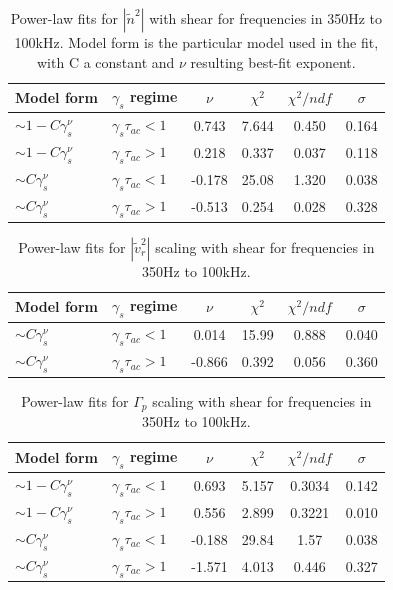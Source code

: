\documentclass[aip,pop,amsmath,amssymb,peprint,superscriptaddress]{revtex4-1} %
\begin{document}
\begin{table}
\caption{\label{tab:table1}Power-law fits for $|\tilde{n}^{2}|$  with shear for frequencies in 350Hz to 100kHz. Model form is the particular model used in the fit, with C a constant and $\nu$ resulting best-fit exponent.}
\begin{ruledtabular}
\begin{tabular}{llcccc}
Model form&$\gamma_{s}$ regime&$\nu$&$\chi^2$&$\chi^2/ndf$&$\sigma$\\
\hline
$\sim 1-C\gamma_{s}^\nu$&$\gamma_{s}\tau_{ac}<1$&0.743&7.644&0.450&0.164\\
$\sim 1-C\gamma_{s}^\nu$&$\gamma_{s}\tau_{ac}>1$&0.218&0.337&0.037&0.118\\
$\sim C\gamma_{s}^\nu$&$\gamma_{s}\tau_{ac}<1$&-0.178&25.08&1.320&0.038\\
$\sim C\gamma_{s}^\nu$&$\gamma_{s}\tau_{ac}>1$&-0.513&0.254&0.028&0.328\\
\end{tabular}
\end{ruledtabular}
\end{table}

\begin{table}
\caption{\label{tab:table2}Power-law fits for $|\tilde{v}_{r}^{2}|$ scaling with shear for frequencies in 350Hz to 100kHz.}
\begin{ruledtabular}
\begin{tabular}{llcccc}
Model form&$\gamma_{s}$ regime&$\nu$&$\chi^2$&$\chi^2/ndf$&$\sigma$\\
\hline
$\sim C\gamma_{s}^\nu$&$\gamma_{s}\tau_{ac}<1$&0.014&15.99&0.888&0.040\\
$\sim C\gamma_{s}^\nu$&$\gamma_{s}\tau_{ac}>1$&-0.866&0.392&0.056&0.360\\
\end{tabular}
\end{ruledtabular}
\end{table}

\begin{table}
\caption{\label{tab:table3}Power-law fits for $\Gamma_{p}$ scaling with shear for frequencies in 350Hz to 100kHz.}
\begin{ruledtabular}
\begin{tabular}{llcccc}
Model form&$\gamma_{s}$ regime&$\nu$&$\chi^2$&$\chi^2/ndf$&$\sigma$\\
\hline
$\sim 1-C\gamma_{s}^\nu$&$\gamma_{s}\tau_{ac}<1$ &0.693   &5.157    &0.3034   &0.142\\
$\sim 1-C\gamma_{s}^\nu$&$\gamma_{s}\tau_{ac}>1$ &0.556   &2.899    &0.3221   &0.010\\
$\sim C\gamma_{s}^\nu$&$\gamma_{s}\tau_{ac}<1$   &-0.188  &29.84    &1.57     &0.038\\
$\sim C\gamma_{s}^\nu$&$\gamma_{s}\tau_{ac}>1$   &-1.571  &4.013    &0.446    &0.327\\
\end{tabular}
\end{ruledtabular}
\end{table}
\end{document}
